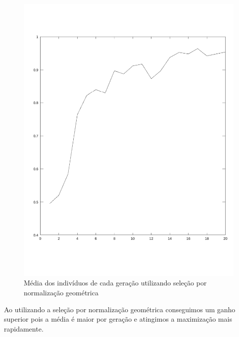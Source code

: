 \documentclass{article}
\begin{document}
\newpage
\begin{figure}[h!]
\centering
\includegraphics[scale=.6]{images/mediaDosIndividuosACadaGeracaoC.pdf}
\caption{Média dos indivíduos de cada geração utilizando seleção por normalização geométrica}
\label{fig:mediaDosIndividuosACadaGeracaoC}
\end{figure}

\begin{flushleft}
	Ao utilizando a seleção por normalização geométrica conseguimos
	um ganho superior pois a média é maior por geração e atingimos a
	maximização mais rapidamente.
\end{flushleft}



\end{document}
